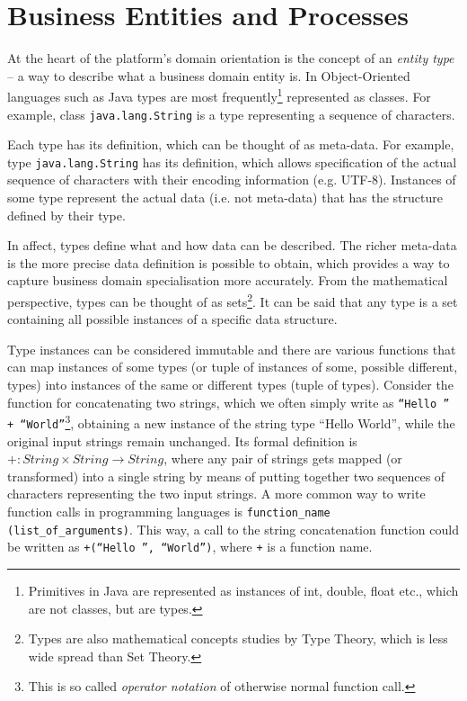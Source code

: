 \chapter{Business Entities and Processes}\label{ch01:01}


  At the heart of the platform's domain orientation is the concept of an \emph{entity type} -- a way to describe what a business domain entity is.
  In Object-Oriented languages such as Java types are most frequently\footnote{Primitives in Java are represented as instances of int, double, float etc., which are not classes, but are types.} represented as classes.
  For example, class \texttt{java.lang.String} is a type representing a sequence of characters.
  
  Each type has its definition, which can be thought of as meta-data.
  For example, type \texttt{java.lang.String} has its definition, which allows specification of the actual sequence of characters with their encoding information (e.g. UTF-8).
  Instances of some type represent the actual data (i.e. not meta-data) that has the structure defined by their type.
  
  In affect, types define what and how data can be described.
  The richer meta-data is the more precise data definition is possible to obtain, which provides a way to capture business domain specialisation more accurately.
  From the mathematical perspective, types can be thought of as sets\footnote{Types are also mathematical concepts studies by Type Theory, which is less wide spread than Set Theory.}.
  It can be said that any type is a set containing all possible instances of a specific data structure.

  Type instances can be considered immutable and there are various functions that can map instances of some types (or tuple of instances of some, possible different, types) into instances of the same or different types (tuple of types).
  Consider the function for concatenating two strings, which we often simply write as \texttt{``Hello '' + ``World''}\footnote{This is so called \emph{operator notation} of otherwise normal function call.}, obtaining a new instance of the string type ``Hello World'', while the original input strings remain unchanged.
  Its formal definition is $+:String\times String \rightarrow String$, where any pair of strings gets mapped (or transformed) into a single string by means of putting together two sequences of characters representing the two input strings.
  A more common way to write function calls in programming languages is \texttt{function\_name (list\_of\_arguments)}.
  This way, a call to the string concatenation function could be written as \texttt{+(``Hello '', ``World'')}, where \texttt{+} is a function name.

